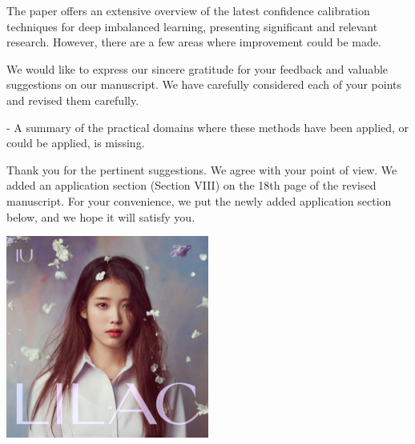 
\reviewer

\begin{generalcomment}
The paper offers an extensive overview of the latest confidence calibration techniques for deep imbalanced learning, presenting significant and relevant research. However, there are a few areas where improvement could be made.
\end{generalcomment}
\begin{revmeta}[]
We would like to express our sincere gratitude for your feedback and valuable suggestions on our manuscript. We have carefully considered each of your points and revised them carefully.
\end{revmeta}

\begin{revcomment}
- A summary of the practical domains where these methods have been applied, or could be applied, is missing.
\end{revcomment}
\begin{revresponse}[]
Thank you for the pertinent suggestions. We agree with your point of view. We added an application section (Section VIII) on the 18th page of the revised manuscript. For your convenience, we put the newly added application section below, and we hope it will satisfy you.
	
\begin{changes}
\lipsum[1-3]

\centering
\includegraphics[width=0.5\textwidth,keepaspectratio]{imgs/IU1.jpg}
\end{changes}
	
\end{revresponse}

\clearpage
\printbibliography[heading=bibintoc, heading=bibliography, title={References}, section=\therefsection]